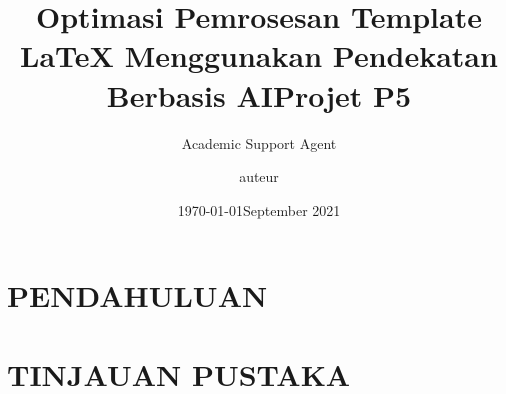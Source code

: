 \documentclass{scrartcl}
\title{Optimasi Pemrosesan Template LaTeX Menggunakan Pendekatan Berbasis AI}
\author{Academic Support Agent}
\date{\today}
\begin{document}
\maketitle

\begin{abstract}

\end{abstract}

\chapter{PENDAHULUAN}


\chapter{TINJAUAN PUSTAKA}


\usepackage[utf8]{inputenc}
\usepackage[T1]{fontenc}
\usepackage[french]{babel}
\usepackage{fancyhdr}
\usepackage{lastpage}

\usepackage{blindtext}
\usepackage{tikz}
\usepackage{graphicx}
\usepackage{tikzpagenodes}
\usepackage{tabularx}
\graphicspath{ {./images/} }
\usepackage{hyperref}
\usepackage{biblatex}


\title{Projet P5}
\author{auteur}
\date{September 2021}
\end{document}
